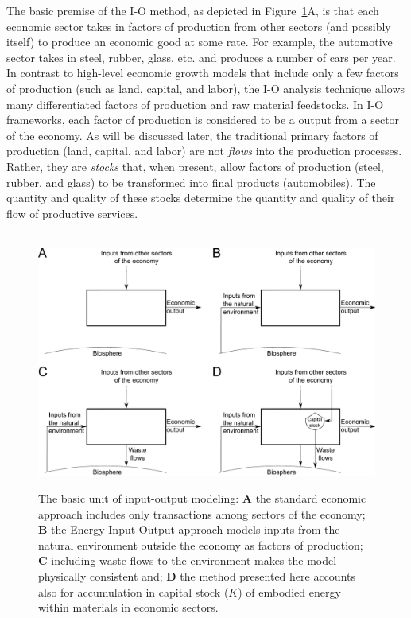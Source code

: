The basic premise of the I-O method, 
as depicted in Figure~\ref{fig:basic_unit}A, 
is that each economic sector takes in factors of production 
from other sectors (and possibly itself) 
to produce an economic good at some rate. 
For example, the automotive sector takes in steel, rubber, glass, etc. 
and produces a number of cars per year. 
In contrast to high-level economic growth models 
that include only a few factors of production (such as land, capital, and labor), 
the I-O analysis technique allows many differentiated factors of production 
and raw material feedstocks.\cite{Costanza:1980ww} 
In I-O frameworks, each factor of production 
is considered to be a output from a sector of the economy. 
As will be discussed later,
the traditional primary factors of production (land, capital, and labor) 
are not \emph{flows} into the production processes. 
Rather, they are \emph{stocks} that, when present, 
allow factors of production (steel, rubber, and glass) 
to be transformed into final products (automobiles). 
The quantity and quality of these stocks 
determine the quantity and quality of their flow of productive services.

\begin{figure}[!ht]
\centering\
\includegraphics[width=\linewidth]{Part_0/Chapter_Introduction/images/Basic_unit_square.pdf}
\caption[The basic unit of input-output modeling]{The basic unit 
of input-output modeling: 
\textbf{A} the standard economic approach includes only transactions 
among sectors of the economy; 
\textbf{B} the Energy Input-Output approach models inputs 
from the natural environment outside the economy as factors of production; 
\textbf{C} including waste flows to the environment makes the model physically consistent and;
\textbf{D} the method presented here accounts also for accumulation
in capital stock
($K$) of embodied energy within materials in economic sectors.}
\label{fig:basic_unit}
\end{figure}

